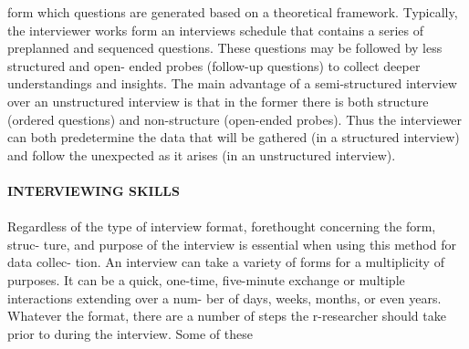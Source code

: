 \documentclass{book}
\begin{document}
form which questions are generated based on a theoretical framework. Typically, the
interviewer works form an interviews schedule that contains a series of preplanned and
sequenced questions. These questions may be followed by less structured and open-
ended probes (follow-up questions) to collect deeper understandings and insights. The
main advantage of a semi-structured interview over an unstructured interview is that in
the former there is both structure (ordered questions) and non-structure (open-ended
probes). Thus the interviewer can both predetermine the data that will be gathered (in
a structured interview) and follow the unexpected as it arises (in an unstructured
interview).
\\
\vspace*{0.3cm}
\\
\textbf{INTERVIEWING SKILLS}
\\
\vspace*{0.3cm}
\\
Regardless of the type of interview format, forethought concerning the form, struc-
ture, and purpose of the interview is essential when using this method for data collec-
tion. An interview can take a variety of forms for a multiplicity of purposes. It can be a
quick, one-time, five-minute exchange or multiple interactions extending over a num-
ber of days, weeks, months, or even years. Whatever the format, there are a number of
steps the r-researcher should take prior to during the interview. Some of these
\end{document}

